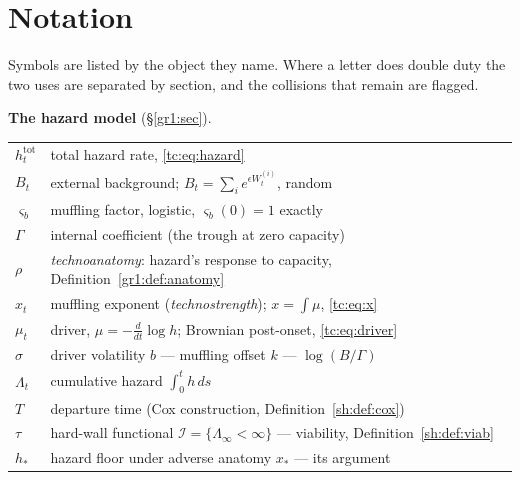 \documentclass[11pt]{article}
\numberwithin{equation}{section}
\theoremstyle{plain}
\theoremstyle{definition}
\theoremstyle{remark}
\newcommand{\Imm}{\mathcal{I}}
\begin{document}
\tableofcontents
\bigskip

\section*{Notation}\label{sec:notation}

\noindent Symbols are listed by the object they name. Where a letter does
double duty the two uses are separated by section, and the collisions
that remain are flagged.

\smallskip
\noindent\textbf{The hazard model} (\S\ref{gr1:sec}).
\begin{center}\small
\begin{tabular}{@{}ll@{}}
\toprule
$h^{\mathrm{tot}}_t$ & total hazard rate, \eqref{tc:eq:hazard}\\
$B_t$ & external background; $B_t=\sum_i e^{\epsilon W^{(i)}_t}$, random\\
$\varsigma_b$ & muffling factor, logistic, $\varsigma_b(0)=1$ exactly\\
$\Gamma$ & internal coefficient (the trough at zero capacity)\\
$\rho$ & \emph{technoanatomy}: hazard's response to capacity,
Definition~\ref{gr1:def:anatomy}\\
$x_t$ & muffling exponent (\emph{technostrength}); $x=\int\mu$,
\eqref{tc:eq:x}\\
$\mu_t$ & driver, $\mu=-\tfrac{d}{dt}\log h$; Brownian post-onset,
\eqref{tc:eq:driver}\\
$\sigma$ & driver volatility \qquad $b$ --- muffling offset \qquad
$k$ --- $\log(B/\Gamma)$\\
$\Lambda_t$ & cumulative hazard $\int_0^t h\,ds$\\
$T$ & departure time (Cox construction, Definition~\ref{sh:def:cox})\\
$\tau$ & hard-wall functional \qquad $\Imm=\{\Lambda_\infty<\infty\}$ ---
viability, Definition~\ref{sh:def:viab}\\
$h_\ast$ & hazard floor under adverse anatomy \qquad $x_\ast$ --- its
argument\\
\bottomrule
\end{tabular}
\end{center}
\end{document}
